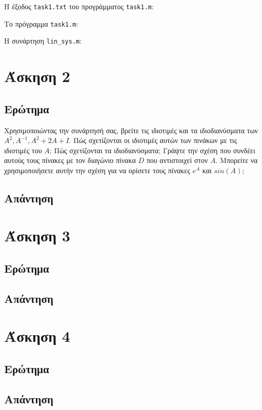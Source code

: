 \documentclass[12pt, fleqn, leqno]{extreport}
\begin{document}
Η έξοδος \lstinline[language={}]{task1.txt} του προγράμματος \lstinline[language={}]{task1.m}:


\newpage
Το πρόγραμμα \lstinline[language={}]{task1.m}:


\newpage
Η συνάρτηση \lstinline[language={}]{lin_sys.m}:



\chapter{Άσκηση 2}

\section{Ερώτημα}
Χρησιμοποιώντας την συνάρτησή σας, βρείτε τις ιδιοτιμές και τα ιδιοδιανύσματα των\\$A^{2}, A^{-1}, A^{2}+2A+I$. Πώς σχετίζονται οι ιδιοτιμές αυτών των πινάκων με τις ιδιοτιμές του $A$; Πώς σχετίζονται τα ιδιοδιανύσματα; Γράψτε την σχέση που συνδέει αυτούς τους πίνακες με τον διαγώνιο πίνακα $D$ που αντιστοιχεί στον $Α$. Μπορείτε να χρησιμοποιήσετε αυτήν την σχέση για να ορίσετε τους πίνακες $e^A$ και $sin(A)$; 


\newpage
\section{Απάντηση}

\chapter{Άσκηση 3}
\section{Ερώτημα}

\newpage
\section{Απάντηση}

\chapter{Άσκηση 4}
\section{Ερώτημα}

\newpage
\section{Απάντηση}
\end{document}
